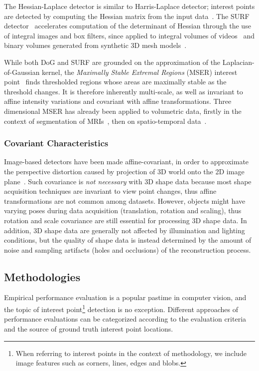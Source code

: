 The Hessian-Laplace detector is similar to Harris-Laplace detector; interest points are detected by computing the Hessian matrix from the input data~\cite{Mikolajczyk2004}. The SURF detector~\cite{Bay2008} accelerates computation of the determinant of Hessian through the use of integral images and box filters, since applied to integral volumes of videos~\cite{Willems2008} and binary volumes generated from synthetic 3D mesh models~\cite{Knopp2010}.

While both DoG and SURF are grounded on the approximation of the Laplacian-of-Gaussian kernel,  the \emph{Maximally Stable Extremal Regions} (MSER) interest point~\cite{Matas2004} finds thresholded regions whose areas are maximally stable as the threshold changes. It is therefore inherently multi-scale, as well as invariant to affine intensity variations and covariant with affine transformations. Three dimensional MSER has already been applied to volumetric data, firstly in the context of segmentation of MRIs~\cite{Donoser2006}, then on spatio-temporal data~\cite{Riemenschneider2009}.

\subsubsection{Covariant Characteristics}

Image-based detectors have been made affine-covariant, in order to approximate the perspective distortion caused by projection of 3D world onto the 2D image plane~\cite{Mikolajczyk2002}. Such covariance is \emph{not necessary} with 3D shape data because most shape acquisition techniques are invariant to view point changes, thus affine transformations are not common among datasets. However, objects might have varying poses during data acquisition (\ie translation, rotation and scaling), thus rotation and scale covariance are still essential for processing 3D shape data. In addition, 3D shape data are generally not affected by illumination and lighting conditions, but the quality of shape data is instead determined by the amount of noise and sampling artifacts (\eg holes and occlusions) of the reconstruction process. 

\subsection{Methodologies}
Empirical performance evaluation is a popular pastime in computer vision, and the topic of interest point\footnote{When referring to interest points in the context of methodology, we include image features such as corners, lines, edges and blobs.} detection is no exception. Different approaches of performance evaluations can be categorized according to the evaluation criteria and the source of ground truth interest point locations. 

